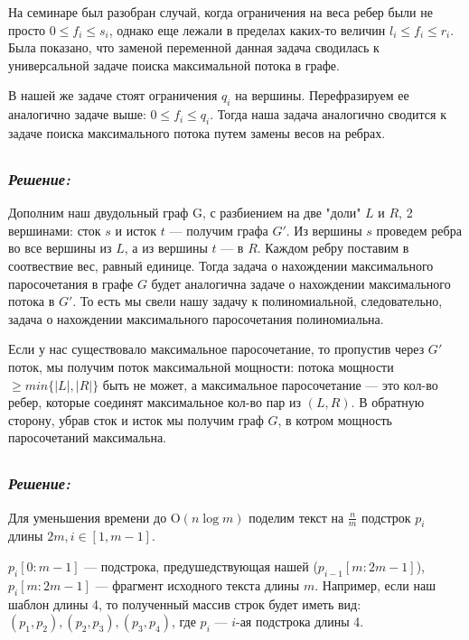 \documentclass[a4paper, 12pt]{article}
\newcommand*\circled[1]{\tikz[baseline=(char.base)]{
            \node[shape=circle,draw,inner sep=2pt] (char) {#1};}}
\begin{document}
На семинаре был разобран случай, когда ограничения на веса ребер были не просто $0 \leq f_i \leq s_i$, однако еще лежали в пределах каких-то величин $l_i \leq f_i \leq r_i$. Была показано, что заменой переменной данная задача сводилась к универсальной задаче поиска максимальной потока в графе.

В нашей же задаче стоят ограничения $q_i$ на вершины. Перефразируем ее аналогично задаче выше: $0 \leq f_i \leq q_i$. Тогда наша задача аналогично сводится к задаче поиска максимального потока путем замены весов на ребрах.

\subsection*{\circled{7}} 
\subsubsection*{\textit{Решение:}}

Дополним наш двудольный граф G, с разбиением на две "доли" $L$ и $R$, 2 вершинами: сток $s$ и исток $t$ — получим графа $G'$. Из вершины $s$ проведем ребра во все вершины из $L$, а из вершины $t$ — в $R$. Каждом ребру поставим в соотвествие вес, равный единице. Тогда задача о нахождении максимального паросочетания в графе $G$ будет аналогична задаче о нахождении максимального потока в $G'$. То есть мы свели нашу задачу к полиномиальной, следовательно, задача о нахождении максимального паросочетания полиномиальна.

Если у нас существовало максимальное паросочетание, то пропустив через $G'$ поток, мы получим поток максимальной мощности: потока мощности $\geq min\{|L|, |R|\}$ быть не может, а максимальное паросочетание — это кол-во ребер, которые соединят максимальное кол-во пар из $(L, R)$. В обратную сторону, убрав сток и исток мы получим граф $G$, в котром мощность паросочетаний максимальна.

\subsection*{\circled{9}} 
\subsubsection*{\textit{Решение:}}

Для уменьшения времени до $\mathrm{O}(n \log m)$ поделим текст на $\frac{n}{m}$ подстрок $p_i$ длины $2m, i\in[1,m-1]$. 

$p_i[0:m-1]$ — подстрока, предушедствующая нашей ($p_{i-1}[m:2m-1]$), $p_i[m:2m-1]$ — фрагмент исходного текста длины $m$. Например, если наш шаблон длины 4, то полученный массив строк будет иметь вид: $(p_1, p_2), (p_2, p_3), (p_3, p_4)$, где $p_i$ — $i$-ая подстрока длины 4.
\end{document}
